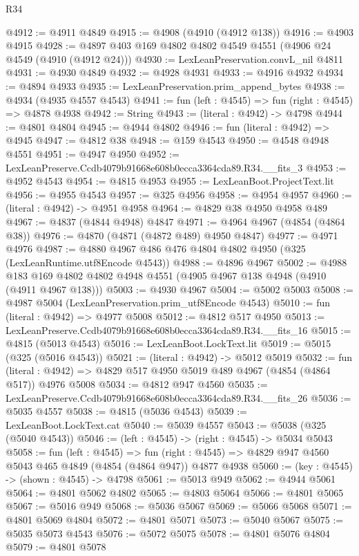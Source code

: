 \begin{lexlean}{R34}
\begin{coremodule}
@4912 := @4911 @4849
@4915 := @4908 (@4910 (@4912 @138))
@4916 := @4903 @4915
@4928 := @4897 @403 @169 @4802 @4802 @4549 @4551 (@4906 @24 @4549 (@4910 (@4912 @24)))
@4930 := LexLeanPreservation.convL_nil @4811
@4931 := @4930 @4849
@4932 := @4928 @4931
@4933 := @4916 @4932
@4934 := @4894 @4933
@4935 := LexLeanPreservation.prim_append_bytes
@4938 := @4934 (@4935 @4557 @4543)
@4941 := fun (left : @4545) => fun (right : @4545) => @4878 @4938
@4942 := String
@4943 := (literal : @4942) -> @4798
@4944 := @4801 @4804
@4945 := @4944 @4802
@4946 := fun (literal : @4942) => @4945
@4947 := @4812 @38
@4948 := @159 @4543
@4950 := @4548 @4948 @4551
@4951 := @4947 @4950
@4952 := LexLeanPreserve.Ccdb4079b91668e608b0ecca3364cda89.R34.__fits_3
@4953 := @4952 @4543
@4954 := @4815 @4953
@4955 := LexLeanBoot.ProjectText.lit
@4956 := @4955 @4543
@4957 := @325 @4956
@4958 := @4954 @4957
@4960 := (literal : @4942) -> @4951 @4958
@4964 := @4829 @38 @4950 @4958 @489
@4967 := @4837 (@4844 @4948) @4847
@4971 := @4964 @4967 (@4854 (@4864 @38))
@4976 := @4870 (@4871 (@4872 @489) @4950 @4847)
@4977 := @4971 @4976
@4987 := @4880 @4967 @486 @476 @4804 @4802 @4950 (@325 (LexLeanRuntime.utf8Encode @4543))
@4988 := @4896 @4967
@5002 := @4988 @183 @169 @4802 @4802 @4948 @4551 (@4905 @4967 @138 @4948 (@4910 (@4911 @4967 @138)))
@5003 := @4930 @4967
@5004 := @5002 @5003
@5008 := @4987 @5004 (LexLeanPreservation.prim_utf8Encode @4543)
@5010 := fun (literal : @4942) => @4977 @5008
@5012 := @4812 @517 @4950
@5013 := LexLeanPreserve.Ccdb4079b91668e608b0ecca3364cda89.R34.__fits_16
@5015 := @4815 (@5013 @4543)
@5016 := LexLeanBoot.LockText.lit
@5019 := @5015 (@325 (@5016 @4543))
@5021 := (literal : @4942) -> @5012 @5019
@5032 := fun (literal : @4942) => @4829 @517 @4950 @5019 @489 @4967 (@4854 (@4864 @517)) @4976 @5008
@5034 := @4812 @947 @4560
@5035 := LexLeanPreserve.Ccdb4079b91668e608b0ecca3364cda89.R34.__fits_26
@5036 := @5035 @4557
@5038 := @4815 (@5036 @4543)
@5039 := LexLeanBoot.LockText.cat
@5040 := @5039 @4557
@5043 := @5038 (@325 (@5040 @4543))
@5046 := (left : @4545) -> (right : @4545) -> @5034 @5043
@5058 := fun (left : @4545) =>
  fun (right : @4545) => @4829 @947 @4560 @5043 @465 @4849 (@4854 (@4864 @947)) @4877 @4938
@5060 := (key : @4545) -> (shown : @4545) -> @4798
@5061 := @5013 @949
@5062 := @4944 @5061
@5064 := @4801 @5062 @4802
@5065 := @4803 @5064
@5066 := @4801 @5065
@5067 := @5016 @949
@5068 := @5036 @5067
@5069 := @5066 @5068
@5071 := @4801 @5069 @4804
@5072 := @4801 @5071
@5073 := @5040 @5067
@5075 := @5035 @5073 @4543
@5076 := @5072 @5075
@5078 := @4801 @5076 @4804
@5079 := @4801 @5078

\end{coremodule}
\end{lexlean}
